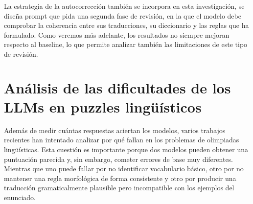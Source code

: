 La estrategia de la autocorrección también se incorpora en esta investigación, se diseña prompt que pida una segunda fase de revisión, en la que el modelo debe comprobar la coherencia entre sus traducciones, su diccionario y las reglas que ha formulado. Como veremos más adelante, los resultados no siempre mejoran respecto al baseline, lo que permite analizar también las limitaciones de este tipo de revisión.

\section{Análisis de las dificultades de los LLMs en puzzles lingüísticos}
\label{sec:dificultades}

Además de medir cuántas respuestas aciertan los modelos, varios trabajos recientes han intentado analizar por qué fallan en los problemas de olimpiadas lingüísticas. Esta cuestión es importante porque dos modelos pueden obtener una puntuación parecida y, sin embargo, cometer errores de base muy diferentes. Mientras que uno puede fallar por no identificar vocabulario básico, otro por no mantener una regla morfológica de forma consistente y otro por producir una traducción gramaticalmente plausible pero incompatible con los ejemplos del enunciado.

